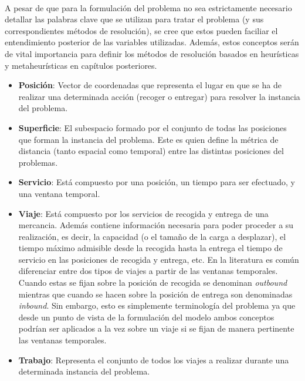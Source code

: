 \documentclass{subfiles}
\begin{document}
        \paragraph{}
        A pesar de que para la formulación del problema no sea estrictamente necesario detallar las palabras clave que se utilizan para tratar el problema (y sus correspondientes métodos de resolución), se cree que estos pueden faciliar el entendimiento posterior de las variables utilizadas. Además, estos conceptos serán de vital importancia para definir los métodos de resolución basados en heurísticas y metaheurísticas en capítulos posteriores.

        \begin{itemize}

          \item \textbf{Posición}: Vector de coordenadas que representa el lugar en que se ha de realizar una determinada acción (recoger o entregar) para resolver la instancia del problema.

          \item \textbf{Superficie}: El subespacio formado por el conjunto de todas las posiciones que forman la instancia del problema. Este es quien define la métrica de distancia (tanto espacial como temporal) entre las distintas posiciones del problemas.

          \item \textbf{Servicio}: Está compuesto por una posición, un tiempo para ser efectuado, y una ventana temporal.

          \item \textbf{Viaje}: Está compuesto por los servicios de recogida y entrega de una mercancia. Además contiene información necesaria para poder proceder a su realización, es decir, la capacidad (o el tamaño de la carga a desplazar), el tiempo máximo admisible desde la recogida hasta la entrega el tiempo de servicio en las posiciones de recogida y entrega, etc. En la literatura es común diferenciar entre dos tipos de viajes a partir de las ventanas temporales. Cuando estas se fijan sobre la posición de recogida se denominan \emph{outbound} mientras que cuando se hacen sobre la posición de entrega son denominadas \emph{inbound}. Sin embargo, esto es simplemente terminología del problema ya que desde un punto de vista de la formulación del modelo ambos conceptos podrían ser aplicados a la vez sobre un viaje si se fijan de manera pertinente las ventanas temporales.

          \item \textbf{Trabajo}: Representa el conjunto de todos los viajes a realizar durante una determinada instancia del problema.


\end{itemize}
\end{document}
